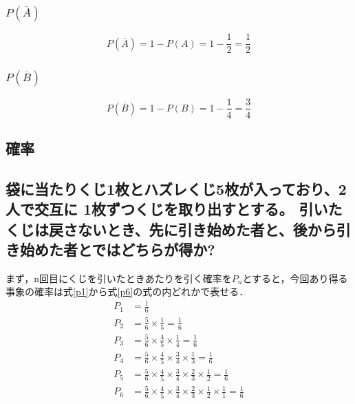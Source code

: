 \documentclass[titlepage,a4paper]{jsarticle}
\begin{document}
\subsubsection{$P(\overline{A})$}
\begin{equation}
  P(\overline{A})=1-P(A)=1-\frac{1}{2}=\frac{1}{2}
\end{equation}
\subsubsection{$P(\overline{B})$}
\begin{equation}
  P(\overline{B})=1-P(B)=1-\frac{1}{4}=\frac{3}{4}
\end{equation}

\subsection{確率}
\subsection*{袋に当たりくじ1枚とハズレくじ5枚が入っており、2人で交互に 1枚ずつくじを取り出すとする。
  引いたくじは戻さないとき、先に引き始めた者と、後から引き始めた者とではどちらが得か?}
まず，n回目にくじを引いたときあたりを引く確率を$P_n$とすると，今回あり得る事象の確率は式\eqref{p1}から式\eqref{p6}の式の内どれかで表せる．
\begin{align}
  P_1 & = \frac{1}{6} \label{p1}                                                                                                              \\
  P_2 & = \frac{5}{6} \times \frac{1}{5} = \frac{1}{6} \label{p2}                                                                             \\
  P_3 & = \frac{5}{6} \times \frac{4}{5} \times \frac{1}{4} = \frac{1}{6} \label{p3}                                                          \\
  P_4 & = \frac{5}{6} \times \frac{4}{5} \times \frac{3}{4} \times \frac{1}{3} = \frac{1}{6} \label{p4}                                       \\
  P_5 & = \frac{5}{6} \times \frac{4}{5} \times \frac{3}{4} \times \frac{2}{3} \times \frac{1}{2} = \frac{1}{6} \label{p5}                    \\
  P_6 & = \frac{5}{6} \times \frac{4}{5} \times \frac{3}{4} \times \frac{2}{3} \times \frac{1}{2} \times \frac{1}{1} = \frac{1}{6} \label{p6}
\end{align}
\end{document}
